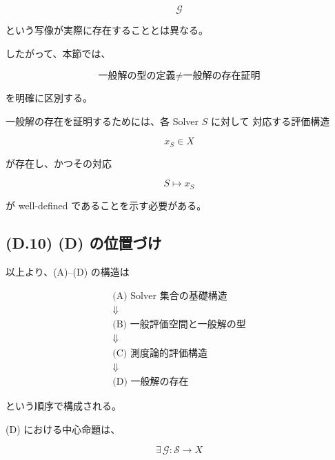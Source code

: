 \documentclass[a4paper,11pt]{article}
\newcommand{\Solver}{\mathcal{S}}
\begin{document}
\begin{equation}
    \mathcal{G}
\end{equation}

という写像が実際に存在することとは異なる。

したがって、本節では、

\begin{equation}
    \boxed{
        \text{一般解の型の定義}
        \neq
        \text{一般解の存在証明}
    }
\end{equation}

を明確に区別する。

一般解の存在を証明するためには、各 Solver $S$ に対して
対応する評価構造

\begin{equation}
    x_S\in X
\end{equation}

が存在し、かつその対応

\begin{equation}
    S\mapsto x_S
\end{equation}

が well-defined であることを示す必要がある。


\subsection{(D.10) (D) の位置づけ}
\label{subsec:D10}

以上より、(A)--(D) の構造は

\begin{equation}
    \boxed{
    \begin{array}{c}
        \text{(A) Solver 集合の基礎構造}
        \\[2mm]
        \Downarrow
        \\[2mm]
        \text{(B) 一般評価空間と一般解の型}
        \\[2mm]
        \Downarrow
        \\[2mm]
        \text{(C) 測度論的評価構造}
        \\[2mm]
        \Downarrow
        \\[2mm]
        \text{(D) 一般解の存在}
    \end{array}
    }
\end{equation}

という順序で構成される。

(D) における中心命題は、

\begin{equation}
    \boxed{
        \exists\,
        \mathcal{G}:
        \Solver\to X
    }
\end{equation}
\end{document}
